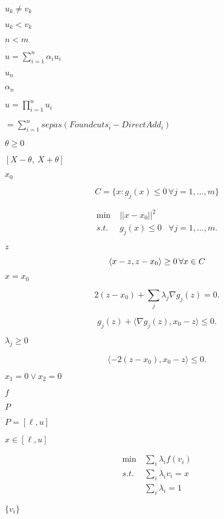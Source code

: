 \documentclass{article}
\begin{document}
$u_k \neq v_k$
\pagebreak

$u_k < v_k$
\pagebreak

$n < m$
\pagebreak

$u = \sum_{i=1}^n \alpha_i u_i$
\pagebreak

$u_n$
\pagebreak

$\alpha_n$
\pagebreak

$u = \prod_{i=1}^n u_i$
\pagebreak

$= \sum_{i=1}^nsepas ( Foundcuts_i - DirectAdd_i )$
\pagebreak

$ \theta \geq 0$
\pagebreak

$ [X - \theta, \ X + \theta]$
\pagebreak

$ x_0 $
\pagebreak

\[
     C = \{ x \colon g_j(x) \le 0 \, \forall j=1,\ldots,m \}
\]
\pagebreak

\begin{align}
     \min \; & || x - x_0 ||^2 \\
     s.t. \; & g_j(x) \le 0 & \forall j=1,\ldots,m.
\end{align}
\pagebreak

$ z $
\pagebreak

\[
     \langle x - z, z - x_0 \rangle \ge 0 \, \forall x \in C \\
\]
\pagebreak

$ x = x_0 $
\pagebreak

\[
     2 (z - x_0) + \sum_j \lambda_j \nabla g_j(z) = 0.
\]
\pagebreak

\[
     g_j(z) + \langle \nabla g_j(z), x_0 - z \rangle \le 0.
\]
\pagebreak

$ \lambda_j \ge 0 $
\pagebreak

\[
     \langle -2(z - x_0), x_0 - z \rangle \le 0.
\]
\pagebreak

$x_1 = 0 \vee x_2 = 0$
\pagebreak

$ f $
\pagebreak

$P$
\pagebreak

$ P = [\ell,u]$
\pagebreak

$ x \in [\ell,u] $
\pagebreak

\begin{align}
    \min \, & \sum_i \lambda_i f(v_i)  \\
    s.t. \, & \sum_i \lambda_i v_i = x \\
            & \sum_i \lambda_i = 1
\end{align}
\pagebreak

$ \{ v_i \} $
\pagebreak
\end{document}
